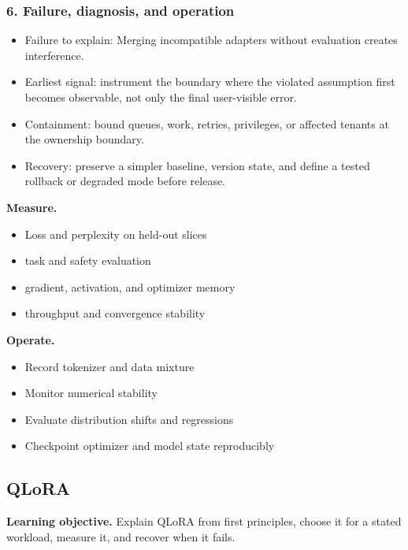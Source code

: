 \subsubsection*{6. Failure, diagnosis, and operation}
\begin{itemize}
\item Failure to explain: Merging incompatible adapters without evaluation creates interference.
\item Earliest signal: instrument the boundary where the violated assumption first becomes observable, not only the final user-visible error.
\item Containment: bound queues, work, retries, privileges, or affected tenants at the ownership boundary.
\item Recovery: preserve a simpler baseline, version state, and define a tested rollback or degraded mode before release.
\end{itemize}
\textbf{Measure.}\begin{itemize}
\item Loss and perplexity on held-out slices
\item task and safety evaluation
\item gradient, activation, and optimizer memory
\item throughput and convergence stability
\end{itemize}
\textbf{Operate.}\begin{itemize}
\item Record tokenizer and data mixture
\item Monitor numerical stability
\item Evaluate distribution shifts and regressions
\item Checkpoint optimizer and model state reproducibly
\end{itemize}
\subsection{QLoRA}
\textbf{Learning objective.} Explain QLoRA from first principles, choose it for a stated workload, measure it, and recover when it fails.
